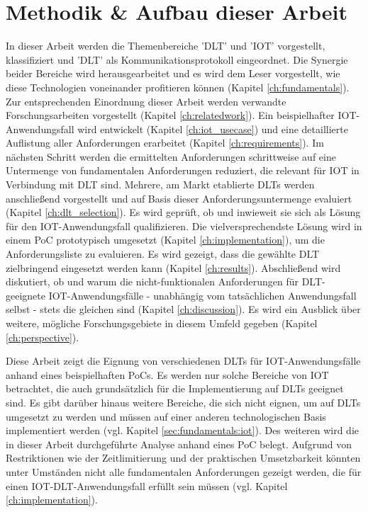 \section{Methodik \& Aufbau dieser Arbeit}
\label{sec:intro:methodology}
In dieser Arbeit werden die Themenbereiche '\ac{DLT}' und '\ac{IOT}' vorgestellt, klassifiziert und '\ac{DLT}' als Kommunikationsprotokoll eingeordnet. Die Synergie beider Bereiche wird herausgearbeitet und es wird dem Leser vorgestellt, wie diese Technologien voneinander profitieren können (Kapitel \ref{ch:fundamentals}). Zur entsprechenden Einordnung dieser Arbeit werden verwandte Forschungsarbeiten vorgestellt (Kapitel \ref{ch:relatedwork}). Ein beispielhafter \ac{IOT}-Anwendungsfall wird entwickelt (Kapitel \ref{ch:iot_usecase}) und eine detaillierte Auflistung aller Anforderungen erarbeitet (Kapitel \ref{ch:requirements}). Im nächsten Schritt werden die ermittelten Anforderungen schrittweise auf eine Untermenge von fundamentalen Anforderungen reduziert, die relevant für \ac{IOT} in Verbindung mit \ac{DLT} sind. Mehrere, am Markt etablierte \ac{DLT}s werden anschließend vorgestellt und auf Basis dieser Anforderungsuntermenge evaluiert (Kapitel \ref{ch:dlt_selection}). Es wird geprüft, ob und inwieweit sie sich als Lösung für den \ac{IOT}-Anwendungsfall qualifizieren. Die vielversprechendste Lösung wird in einem \ac{PoC} prototypisch umgesetzt (Kapitel \ref{ch:implementation}), um die Anforderungsliste zu evaluieren. Es wird gezeigt, dass die gewählte \ac{DLT} zielbringend eingesetzt werden kann (Kapitel \ref{ch:results}). Abschließend wird diskutiert, ob und warum die nicht-funktionalen Anforderungen für \ac{DLT}-geeignete \ac{IOT}-Anwendungsfälle - unabhängig vom tatsächlichen Anwendungsfall selbst - stets die gleichen sind (Kapitel \ref{ch:discussion}). Es wird ein Ausblick über weitere, mögliche Forschungsgebiete in diesem Umfeld gegeben (Kapitel \ref{ch:perspective}).

Diese Arbeit zeigt die Eignung von verschiedenen \ac{DLT}s für \ac{IOT}-Anwendungsfälle anhand eines beispielhaften \ac{PoC}s. Es werden nur solche Bereiche von \ac{IOT} betrachtet, die auch grundsätzlich für die Implementierung auf \ac{DLT}s geeignet sind. Es gibt darüber hinaus weitere Bereiche, die sich nicht eignen, um auf \ac{DLT}s umgesetzt zu werden und müssen auf einer anderen technologischen Basis implementiert werden (vgl. Kapitel \ref{sec:fundamentals:iot}). Des weiteren wird die in dieser Arbeit durchgeführte Analyse anhand eines \ac{PoC} belegt. Aufgrund von Restriktionen wie der Zeitlimitierung und der praktischen Umsetzbarkeit könnten unter Umständen nicht alle fundamentalen Anforderungen gezeigt werden, die für einen \ac{IOT}-\ac{DLT}-Anwendungsfall erfüllt sein müssen (vgl. Kapitel \ref{ch:implementation}).
